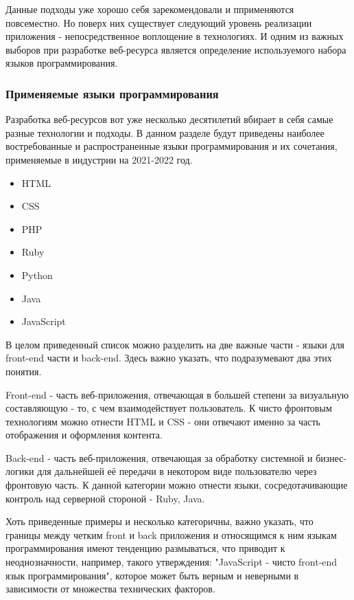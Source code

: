         Данные подходы уже хорошо себя зарекомендовали и пприменяются повсеместно.
        Но поверх них существует следующий уровень реализации приложения - непосредственное воплощение в технологиях.
        И одним из важных выборов при разработке веб-ресурса является определение используемого набора языков программирования.

    \subsubsection{Применяемые языки программирования}
        Разработка веб-ресурсов вот уже несколько десятилетий вбирает в себя самые разные технологии и подходы.
        В данном разделе будут приведены наиболее востребованные и распространенные языки программирования и их сочетания, применяемые в индустрии на 2021-2022 год.
        \begin{itemize}
            \item HTML
            \item CSS
            \item PHP
            \item Ruby
            \item Python
            \item Java
            \item JavaScript
        \end{itemize}
        
        В целом приведенный список можно разделить на две важные части - языки для front-end части и back-end.
        Здесь важно указать, что подразумевают два этих понятия.

        Front-end - часть веб-приложения, отвечающая в большей степени за визуальную составляющую - то, с чем взаимодействует пользователь.
        К чисто фронтовым технологиям можно отнести HTML и CSS - они отвечают именно за часть отображения и оформления контента.
        
        Back-end - часть веб-приложения, отвечающая за обработку системной и бизнес-логики для дальнейшей её передачи в некотором виде пользователю через фронтовую часть.
        К данной категории можно отнести языки, сосредотачивающие контроль над серверной стороной - Ruby, Java.

        Хоть приведенные примеры и несколько категоричны, важно указать, что границы между четким front и back приложения и относящимся к ним языкам программирования имеют тенденцию размываться, что приводит к неоднозначности, например, такого утверждения: "JavaScript - чисто front-end язык программирования", которое может быть верным и неверными в зависимости от множества технических факторов.


